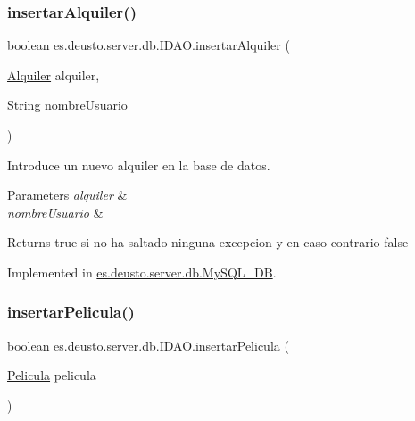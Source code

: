 \mbox{\label{interfacees_1_1deusto_1_1server_1_1db_1_1_i_d_a_o_a3a79fb98127799a4f66c0a90006b0311}} 
\subsubsection{\texorpdfstring{insertarAlquiler()}{insertarAlquiler()}}
{\footnotesize\ttfamily boolean es.\+deusto.\+server.\+db.\+I\+D\+A\+O.\+insertar\+Alquiler (\begin{DoxyParamCaption}\item[{\mbox{\hyperlink{classes_1_1deusto_1_1client_1_1data_1_1_alquiler}{Alquiler}}}]{alquiler,  }\item[{String}]{nombre\+Usuario }\end{DoxyParamCaption})}

Introduce un nuevo alquiler en la base de datos. 
\begin{DoxyParams}{Parameters}
{\em alquiler} & \\
\hline
{\em nombre\+Usuario} & \\
\hline
\end{DoxyParams}
\begin{DoxyReturn}{Returns}
true si no ha saltado ninguna excepcion y en caso contrario false 
\end{DoxyReturn}


Implemented in \mbox{\hyperlink{classes_1_1deusto_1_1server_1_1db_1_1_my_s_q_l___d_b_aa72369de0326a5904e3e9c83a3bff777}{es.\+deusto.\+server.\+db.\+My\+S\+Q\+L\+\_\+\+DB}}.

\mbox{\label{interfacees_1_1deusto_1_1server_1_1db_1_1_i_d_a_o_ad193e4bfd067962ac138c13af0b786b4}} 
\subsubsection{\texorpdfstring{insertarPelicula()}{insertarPelicula()}}
{\footnotesize\ttfamily boolean es.\+deusto.\+server.\+db.\+I\+D\+A\+O.\+insertar\+Pelicula (\begin{DoxyParamCaption}\item[{\mbox{\hyperlink{classes_1_1deusto_1_1client_1_1data_1_1_pelicula}{Pelicula}}}]{pelicula }\end{DoxyParamCaption})}

